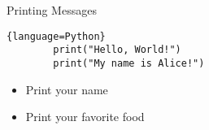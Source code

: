 \begin{frame}[fragile]{Printing Messages}
	\begin{lstlisting}{language=Python}
        print("Hello, World!")
        print("My name is Alice!")
    \end{lstlisting}
	\pause
	\begin{itemize}
		\item Print your name
		\item Print your favorite food
	\end{itemize}
\end{frame}